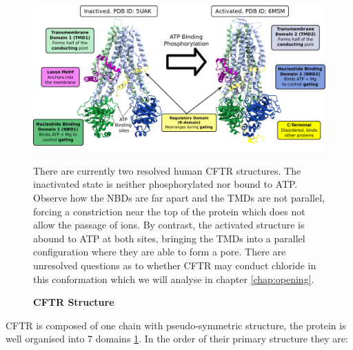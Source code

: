 \begin{figure}
	\begin{center}
	\includegraphics[width=\textwidth]{figures/CFTR_structure.pdf}
	\end{center}
	\label{CFTR_structure_domains}
	\captionsetup{singlelinecheck = false, justification=raggedright}
	\caption[CFTR Structure] {\textbf{CFTR Structure}}{There are currently two resolved human CFTR structures. The inactivated state is neither phosphorylated nor bound to ATP. Observe how the NBDs are far apart and the TMDs are not parallel, forcing a constriction near the top of the protein which does not allow the passage of ions. By contrast, the activated structure is abound to ATP at both sites, bringing the TMDs into a parallel configuration where they are able to form a pore. There are unresolved questions as to whether CFTR may conduct chloride in this conformation which we will analyse in chapter \ref{chap:opening}.} 

\end{figure}
CFTR is composed of one chain with pseudo-symmetric structure, the protein is well organised into 7 domains \ref{CFTR_structure_domains}. In the order of their primary structure they are: 
